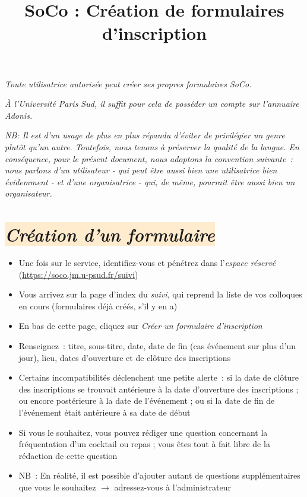 \documentclass[10pt,a4paper]{article}
\title{\bfseries{SoCo : Création de formulaires d'inscription}}
\author{}
\date{}
\newcommand{\rosepale}[1]{\colorbox{BlanchedAlmond}{#1}}
\begin{document}
\pagestyle{empty}


\maketitle

\emph{Toute utilisatrice autorisée peut créer ses propres formulaires SoCo.}

\emph{À l'Université Paris Sud, il suffit pour cela de posséder un compte sur l'annuaire Adonis.}

\small{\emph{NB: Il est d'un usage de plus en plus répandu d'éviter de privilégier un genre plutôt qu'un autre. Toutefois, nous tenons à préserver la qualité de la langue. En conséquence, pour le présent document, nous adoptons la convention suivante : nous parlons d'un utilisateur - qui peut être aussi bien une utilisatrice bien évidemment - et d'une organisatrice - qui, de même, pourrait être aussi bien un organisateur.}}

\section*{\rosepale{\emph{Création d'un formulaire}}}

\begin{itemize}
  \item Une fois sur le service, identifiez-vous et pénétrez dans l'\emph{espace réservé} (\url{https://soco.jm.u-psud.fr/suivi})
  \item Vous arrivez sur la page d'index du \emph{suivi}, qui reprend la liste de vos colloques en cours (formulaires déjà créés, s'il y en a)
  \item En bas de cette page, cliquez sur \emph{Créer un formulaire d'inscription}
  \item Renseignez : titre, sous-titre, date, date de fin (cas événement sur plus d'un jour), lieu, dates d'ouverture et de clôture des inscriptions
    \item Certains incompatibilités déclenchent une petite alerte : si la date de clôture des inscriptions se trouvait antérieure à la date d'ouverture des inscriptions ; ou encore postérieure à la date de l'événement ; ou si la date de fin de l'événement était antérieure à sa date de début
  \item Si vous le souhaitez, vous pouvez rédiger une question concernant la fréquentation d'un cocktail ou repas ; vous êtes tout à fait libre de la rédaction de cette question
  \item NB : En réalité, il est possible d'ajouter autant de questions supplémentaires que vous le souhaitez $\longrightarrow$ adressez-vous à l'administrateur

\end{itemize}
\end{document}
